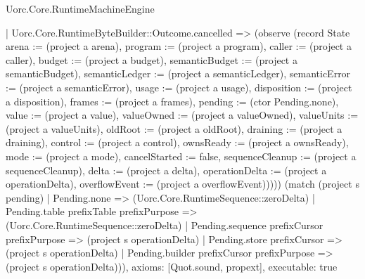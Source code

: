 \begin{lexlean}{Uorc.Core.RuntimeMachineEngine}
\begin{semanticmodule}
{    | Uorc.Core.RuntimeByteBuilder::Outcome.cancelled => (observe (record State {arena := (project a arena), program := (project a program), caller := (project a caller), budget := (project a budget), semanticBudget := (project a semanticBudget), semanticLedger := (project a semanticLedger), semanticError := (project a semanticError), usage := (project a usage), disposition := (project a disposition), frames := (project a frames), pending := (ctor Pending.none), value := (project a value), valueOwned := (project a valueOwned), valueUnits := (project a valueUnits), oldRoot := (project a oldRoot), draining := (project a draining), control := (project a control), ownsReady := (project a ownsReady), mode := (project a mode), cancelStarted := false, sequenceCleanup := (project a sequenceCleanup), delta := (project a delta), operationDelta := (project a operationDelta), overflowEvent := (project a overflowEvent)})))) (match (project s pending)
    | Pending.none => (Uorc.Core.RuntimeSequence::zeroDelta)
    | Pending.table prefixTable prefixPurpose => (Uorc.Core.RuntimeSequence::zeroDelta)
    | Pending.sequence prefixCursor prefixPurpose => (project s operationDelta)
    | Pending.store prefixCursor => (project s operationDelta)
    | Pending.builder prefixCursor prefixPurpose => (project s operationDelta))),
  axioms: [Quot.sound, propext],
  executable: true
}


\end{semanticmodule}
\end{lexlean}
